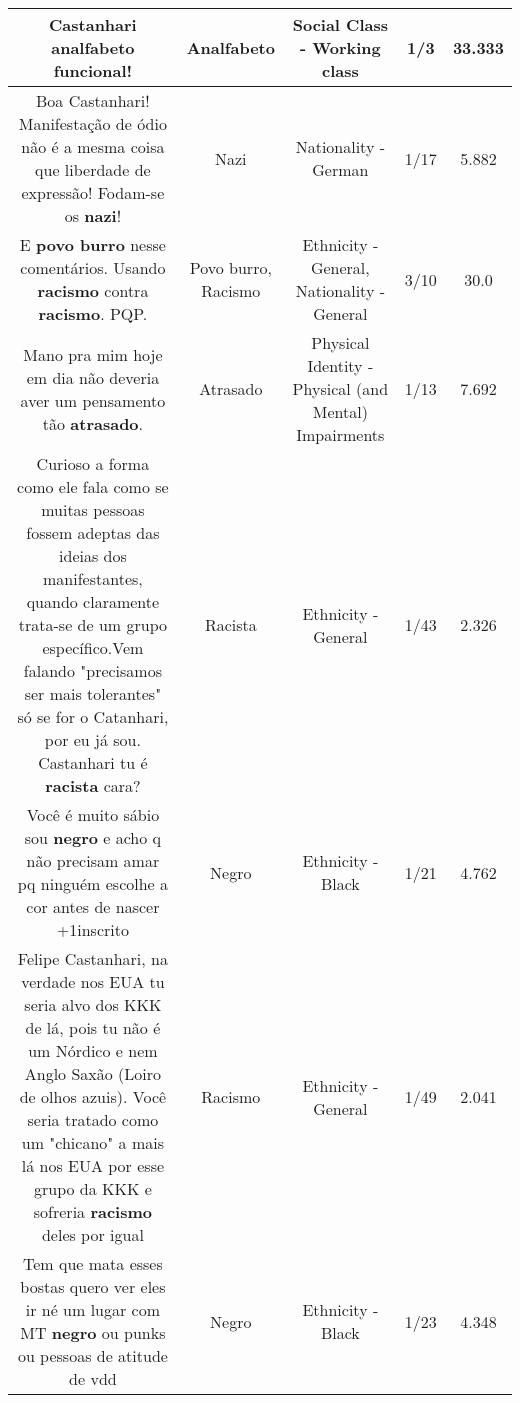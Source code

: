 \documentclass[11pt]{article}
\newlength\mylength
\begin{document}
\begin{center}
\begin{longtable}{|C{.65\mylength}|C{.30\mylength}|C{.12\mylength}|C{.12\mylength}|C{.12\mylength}|}
  \small Castanhari \textbf{analfabeto} funcional!\normalsize   & Analfabeto & Social Class - Working class & 1/3 & 33.333 \\  \hline
  \small Boa Castanhari! Manifestação de ódio não é a mesma coisa que liberdade de expressão! Fodam-se os \textbf{nazi}!\normalsize   & Nazi & Nationality - German & 1/17 & 5.882 \\  \hline
  \small E \textbf{povo burro} nesse comentários. Usando \textbf{racismo} contra \textbf{racismo}. PQP.\normalsize   & Povo burro, Racismo & Ethnicity - General, Nationality - General & 3/10 & 30.0 \\  \hline
  \small Mano pra mim hoje em dia não deveria aver um pensamento tão \textbf{atrasado}.\normalsize   & Atrasado & Physical Identity - Physical (and Mental) Impairments & 1/13 & 7.692 \\  \hline
  \small Curioso a forma como ele fala como se muitas pessoas fossem adeptas das ideias dos manifestantes, quando claramente trata-se de um grupo específico.Vem falando "precisamos ser mais tolerantes" só se for o Catanhari, por eu já sou. Castanhari tu é \textbf{racista} cara?\normalsize   & Racista & Ethnicity - General & 1/43 & 2.326 \\  \hline
  \small Você é muito sábio sou \textbf{negro} e acho q não precisam amar pq ninguém escolhe a cor antes de nascer +1inscrito\normalsize   & Negro & Ethnicity - Black & 1/21 & 4.762 \\  \hline
  \small Felipe Castanhari, na verdade nos EUA tu seria alvo dos KKK de lá, pois tu não é um Nórdico e nem Anglo Saxão (Loiro de olhos azuis). Você seria tratado como um "chicano" a mais lá nos EUA por esse grupo da KKK e sofreria \textbf{racismo} deles por igual\normalsize   & Racismo & Ethnicity - General & 1/49 & 2.041 \\  \hline
  \small Tem que mata esses bostas quero ver eles ir né um lugar com MT \textbf{negro} ou punks ou pessoas de atitude de vdd\normalsize   & Negro & Ethnicity - Black & 1/23 & 4.348 \\  \hline

\end{longtable}
\end{center}
\end{document}
